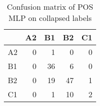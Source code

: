 \begin{table}
  \centering
  \begin{tabular}{|l|rrrr|}
    \toprule
       & A2 & B1 & B2 & C1 \\
    \midrule
    A2 &  0 &  1 &  0 &  0 \\
    B1 &  0 & 36 &  6 &  0 \\
    B2 &  0 & 19 & 47 &  1 \\
    C1 &  0 &  1 & 10 &  2 \\
    \bottomrule
  \end{tabular}
  \caption{Confusion matrix of POS MLP on collapsed labels}
  \label{confusion-collapsed}
\end{table}
